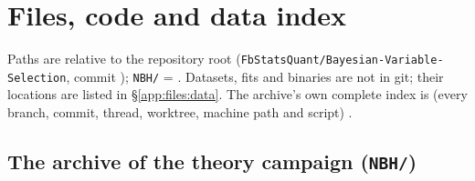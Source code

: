\section{Files, code and data index}\label{app:files}

Paths are relative to the repository root (\texttt{FbStatsQuant/Bayesian-Variable-Selection}, commit \texttt{\sourcecommit}); \texttt{NBH/} = . Datasets, fits and binaries are not in git; their locations are listed in \S\ref{app:files:data}. The archive's own complete index is  (every branch, commit, thread, worktree, machine path and script) .

\subsection{The archive of the theory campaign (\texttt{NBH/})}
